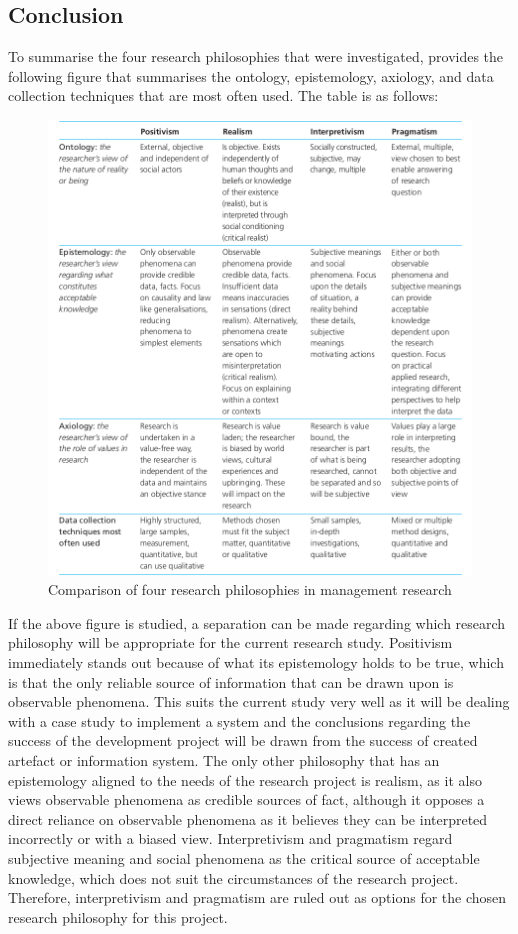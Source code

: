 {{\subsection{Conclusion}
\par{To summarise the four research philosophies that were investigated, \cite{saunders2003research} provides the following figure that summarises the ontology, epistemology, axiology, and data collection techniques that are most often used. The table is as follows:
\clearpage
}
\begin{figure}[h!]
    \centering
    \includegraphics[width=1\linewidth]{img/comparison of research philosophies.png}
    \caption{Comparison of four research philosophies in management research}
    \label{fig:enter-label}
\end{figure}
\par{If the above figure is studied, a separation can be made regarding which research philosophy will be appropriate for the current research study. Positivism immediately stands out because of what its epistemology holds to be true, which is that the only reliable source of information that can be drawn upon is observable phenomena. This suits the current study very well as it will be dealing with a case study to implement a system and the conclusions regarding the success of the development project will be drawn from the success of created artefact or information system. The only other philosophy that has an epistemology aligned to the needs of the research project is realism, as it also views observable phenomena as credible sources of fact, although it opposes a direct reliance on observable phenomena as it believes they can be interpreted incorrectly or with a biased view. Interpretivism and pragmatism regard subjective meaning and social phenomena as the critical source of acceptable knowledge, which does not suit the circumstances of the research project. Therefore, interpretivism and pragmatism are ruled out as options for the chosen research philosophy for this project. }
}}
